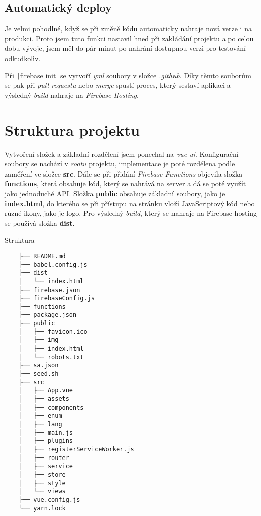 \subsection{Automatický deploy}
Je velmi pohodlné, když se při změně kódu automaticky nahraje nová verze i na produkci. Proto jsem tuto funkci nastavil hned
při zakládání projektu a po celou dobu vývoje, jsem měl do pár minut po nahrání dostupnou verzi pro testování odkudkoliv.

Při \texttt|firebase init| se vytvoří \emph{yml} soubory v složce \emph{.github}. Díky těmto souborům se pak při
\emph{pull requestu} nebo \emph{merge} spustí proces, který sestaví aplikaci a výsledný \emph{build} nahraje na \emph{Firebase Hosting}.


\section{Struktura projektu}
Vytvoření složek a základní rozdělení jsem ponechal na \emph{vue ui}. Konfigurační soubory se nachází v \emph{rootu} projektu, implementace
je poté rozdělena podle zaměření ve složce \textbf{src}. Dále se při přidání \emph{Firebase Functions} objevila složka \textbf{functions}, která
obsahuje kód, který se nahrává na server a dá se poté využít jako jednoduché API. Složka \textbf{public} obsahuje základní soubory, jako je \textbf{index.html},
do kterého se při přístupu na stránku vloží JavaScriptový kód nebo různé ikony, jako je logo. Pro výsledný \emph{build}, který se nahraje na Firebase hosting se
používá složka \textbf{dist}.

\begin{listing}[h]
    \caption{Struktura}
    \begin{verbatim}
    ├── README.md
    ├── babel.config.js
    ├── dist
    │   └── index.html
    ├── firebase.json
    ├── firebaseConfig.js
    ├── functions
    ├── package.json
    ├── public
    │   ├── favicon.ico
    │   ├── img
    │   ├── index.html
    │   └── robots.txt
    ├── sa.json
    ├── seed.sh
    ├── src
    │   ├── App.vue
    │   ├── assets
    │   ├── components
    │   ├── enum
    │   ├── lang
    │   ├── main.js
    │   ├── plugins
    │   ├── registerServiceWorker.js
    │   ├── router
    │   ├── service
    │   ├── store
    │   ├── style
    │   └── views
    ├── vue.config.js
    └── yarn.lock
    \end{verbatim}
\end{listing}

